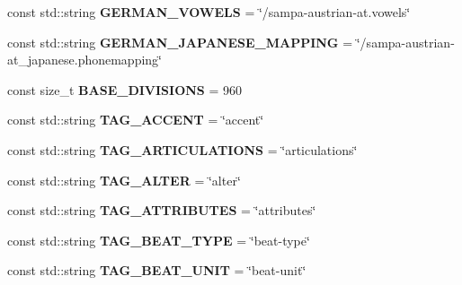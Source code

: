 \begin{DoxyCompactItemize}
\item 
\hypertarget{namespacesinsy_a55bc57c42a9d5505732af2a2e6ab48a1}{const std\-::string {\bfseries \-G\-E\-R\-M\-A\-N\-\_\-\-V\-O\-W\-E\-L\-S} = \char`\"{}/sampa-\/austrian-\/at.\-vowels\char`\"{}}\label{namespacesinsy_a55bc57c42a9d5505732af2a2e6ab48a1}

\item 
\hypertarget{namespacesinsy_a6d2ff0912750dc23c524201ff5e16fcc}{const std\-::string {\bfseries \-G\-E\-R\-M\-A\-N\-\_\-\-J\-A\-P\-A\-N\-E\-S\-E\-\_\-\-M\-A\-P\-P\-I\-N\-G} = \char`\"{}/sampa-\/austrian-\/at\-\_\-japanese.\-phonemapping\char`\"{}}\label{namespacesinsy_a6d2ff0912750dc23c524201ff5e16fcc}

\item 
\hypertarget{namespacesinsy_a61c84bbc7f3c2ceaf6a060f9d0d57beb}{const size\-\_\-t {\bfseries \-B\-A\-S\-E\-\_\-\-D\-I\-V\-I\-S\-I\-O\-N\-S} = 960}\label{namespacesinsy_a61c84bbc7f3c2ceaf6a060f9d0d57beb}

\item 
\hypertarget{namespacesinsy_a7c1db29da9ef0e1c61746c5ed2c7ea4b}{const std\-::string {\bfseries \-T\-A\-G\-\_\-\-A\-C\-C\-E\-N\-T} = \char`\"{}accent\char`\"{}}\label{namespacesinsy_a7c1db29da9ef0e1c61746c5ed2c7ea4b}

\item 
\hypertarget{namespacesinsy_aabceaa4cde922d99d2b514c6541eee94}{const std\-::string {\bfseries \-T\-A\-G\-\_\-\-A\-R\-T\-I\-C\-U\-L\-A\-T\-I\-O\-N\-S} = \char`\"{}articulations\char`\"{}}\label{namespacesinsy_aabceaa4cde922d99d2b514c6541eee94}

\item 
\hypertarget{namespacesinsy_a8d033189b4ff4b34f7bed0159532bbb6}{const std\-::string {\bfseries \-T\-A\-G\-\_\-\-A\-L\-T\-E\-R} = \char`\"{}alter\char`\"{}}\label{namespacesinsy_a8d033189b4ff4b34f7bed0159532bbb6}

\item 
\hypertarget{namespacesinsy_a2b240365dcfe385224e1f5fee6df7dde}{const std\-::string {\bfseries \-T\-A\-G\-\_\-\-A\-T\-T\-R\-I\-B\-U\-T\-E\-S} = \char`\"{}attributes\char`\"{}}\label{namespacesinsy_a2b240365dcfe385224e1f5fee6df7dde}

\item 
\hypertarget{namespacesinsy_a35408a9e71246e06da73c39a77d95c79}{const std\-::string {\bfseries \-T\-A\-G\-\_\-\-B\-E\-A\-T\-\_\-\-T\-Y\-P\-E} = \char`\"{}beat-\/type\char`\"{}}\label{namespacesinsy_a35408a9e71246e06da73c39a77d95c79}

\item 
\hypertarget{namespacesinsy_afc61b20d89c40f07b634fa4e94b22134}{const std\-::string {\bfseries \-T\-A\-G\-\_\-\-B\-E\-A\-T\-\_\-\-U\-N\-I\-T} = \char`\"{}beat-\/unit\char`\"{}}\label{namespacesinsy_afc61b20d89c40f07b634fa4e94b22134}


\end{DoxyCompactItemize}
